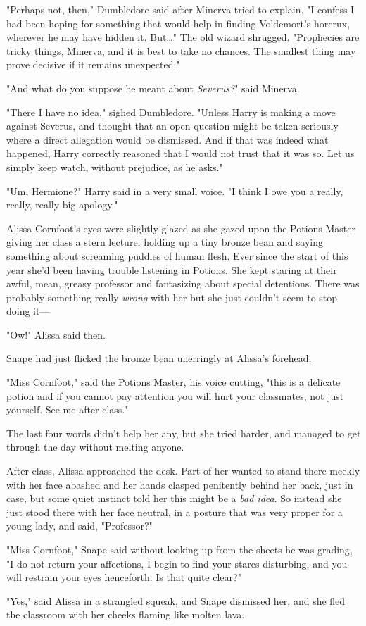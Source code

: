"Perhaps not, then," Dumbledore said after Minerva tried to explain. "I confess
I had been hoping for something that would help in finding Voldemort's horcrux,
wherever he may have hidden it. But{\ldots}" The old wizard shrugged.
"Prophecies are tricky things, Minerva, and it is best to take no chances. The
smallest thing may prove decisive if it remains unexpected."

"And what do you suppose he meant about \emph{Severus?}" said Minerva.

"There I have no idea," sighed Dumbledore. "Unless Harry is making a move
against Severus, and thought that an open question might be taken seriously
where a direct allegation would be dismissed. And if that was indeed what
happened, Harry correctly reasoned that I would not trust that it was so. Let
us simply keep watch, without prejudice, as he asks."

"Um, Hermione?" Harry said in a very small voice. "I think I owe you a really,
really, really big apology."

Alissa Cornfoot's eyes were slightly glazed as she gazed upon the Potions
Master giving her class a stern lecture, holding up a tiny bronze bean and
saying something about screaming puddles of human flesh. Ever since the start
of this year she'd been having trouble listening in Potions. She kept staring
at their awful, mean, greasy professor and fantasizing about special
detentions. There was probably something really \emph{wrong} with her but she
just couldn't seem to stop doing it---

"Ow!" Alissa said then.

Snape had just flicked the bronze bean unerringly at Alissa's forehead.

"Miss Cornfoot," said the Potions Master, his voice cutting, "this is a
delicate potion and if you cannot pay attention you will hurt your classmates,
not just yourself. See me after class."

The last four words didn't help her any, but she tried harder, and managed to
get through the day without melting anyone.

After class, Alissa approached the desk. Part of her wanted to stand there
meekly with her face abashed and her hands clasped penitently behind her back,
just in case, but some quiet instinct told her this might be a \emph{bad idea}.
So instead she just stood there with her face neutral, in a posture that was
very proper for a young lady, and said, "Professor?"

"Miss Cornfoot," Snape said without looking up from the sheets he was grading,
"I do not return your affections, I begin to find your stares disturbing, and
you will restrain your eyes henceforth. Is that quite clear?"

"Yes," said Alissa in a strangled squeak, and Snape dismissed her, and she fled
the classroom with her cheeks flaming like molten lava.
